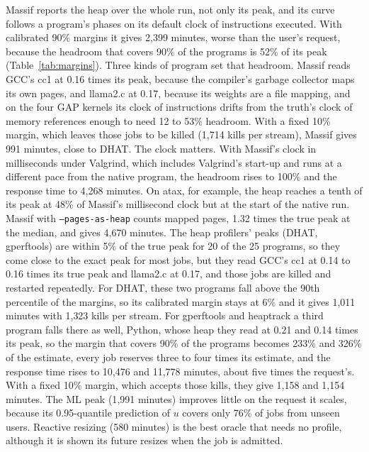 \documentclass[11pt]{article}
\newcommand{\tabref}[1]{Table~\ref{#1}}
\begin{document}
Massif reports the heap over the whole run, not only its peak, and its curve follows a program's phases on its
default clock of instructions executed. With calibrated 90\% margins it gives 2{,}399 minutes, worse than the
user's request, because the headroom that covers 90\% of the programs is 52\% of its peak (\tabref{tab:margins}).
Three kinds of program set that headroom. Massif reads GCC's cc1 at 0.16 times its peak, because the compiler's
garbage collector maps its own pages, and llama2.c at 0.17, because its weights are a file mapping, and on the four
GAP kernels its clock of instructions drifts from the truth's clock of memory references enough to need 12 to 53\%
headroom. With a fixed 10\% margin, which leaves those jobs to be killed (1{,}714 kills per stream), Massif gives
991 minutes, close to DHAT. The clock matters. With Massif's clock in milliseconds under Valgrind, which includes
Valgrind's start-up and runs at a different pace from the native program, the headroom rises to 100\% and the
response time to 4{,}268 minutes. On atax, for example, the heap reaches a tenth of its peak at 48\% of Massif's
millisecond clock but at the start of the native run. Massif with \texttt{--pages-as-heap} counts mapped pages,
1.32 times the true peak at the median, and gives 4{,}670 minutes. The heap profilers' peaks (DHAT, gperftools) are
within 5\% of the true peak for 20 of the 25 programs, so they come close to the exact peak for most jobs, but
they read GCC's cc1 at 0.14 to 0.16 times its true peak and llama2.c at 0.17, and those jobs are killed and
restarted repeatedly. For DHAT, these two programs fall above the 90th percentile of the margins, so its calibrated
margin stays at 6\% and it gives 1{,}011 minutes with 1{,}323 kills per stream. For gperftools and heaptrack a third
program falls there as well, Python, whose heap they read at 0.21 and 0.14 times its peak, so the margin that
covers 90\% of the programs becomes 233\% and 326\% of the estimate, every job reserves three to four times its
estimate, and the response time rises to 10{,}476 and 11{,}778 minutes, about five times the request's. With a fixed 10\%
margin, which accepts those kills, they give 1{,}158 and 1{,}154 minutes. The ML peak (1{,}991 minutes) improves
little on the request it scales, because its 0.95-quantile prediction of $u$ covers only 76\% of jobs from unseen
users. Reactive resizing (580 minutes) is the best oracle that needs no profile, although it is shown its future
resizes when the job is admitted.
\end{document}
